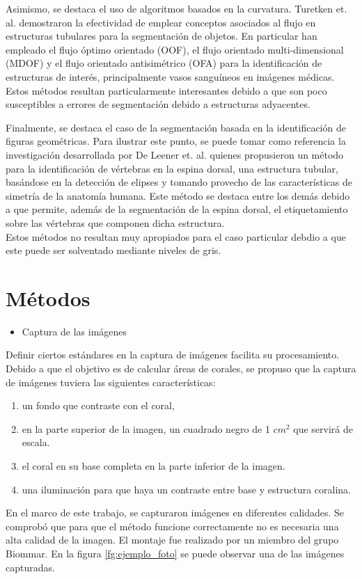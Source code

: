 \documentclass[journal]{IEEEtran}
\begin{document}
Asimismo, se destaca el uso de algoritmos basados en la curvatura. Turetken et. al.
\cite{flujo} demostraron la efectividad de emplear conceptos asociados al flujo en
estructuras tubulares para la segmentación de objetos. En particular han empleado el
flujo óptimo orientado (OOF), el flujo orientado multi-dimensional (MDOF) y el flujo
orientado antisimétrico (OFA) para la identificación de estructuras de interés,
principalmente vasos sanguíneos en imágenes médicas. Estos métodos resultan
particularmente interesantes debido a que son poco susceptibles a errores de segmentación
debido a estructuras adyacentes.

Finalmente, se destaca el caso de la segmentación basada en la identificación de figuras
geométricas. Para ilustrar este punto, se puede tomar como referencia la investigación
desarrollada por De Leener et. al. \cite{espina} quienes propusieron un método para la
identificación de vértebras en la espina dorsal, una estructura tubular, basándose en la
detección de elipses y tomando provecho de las características de simetría de la anatomía
humana. Este método se destaca entre los demás debido a que permite, además de la
segmentación de la espina dorsal, el etiquetamiento sobre las vértebras que componen
dicha estructura.\\
Estos métodos no resultan muy apropiados para el caso particular debdio a que este puede ser solventado mediante niveles de gris.

\section{Métodos}

\begin{itemize}
    \item Captura de las imágenes
\end{itemize}

\begin{par}
Definir ciertos estándares en la captura de imágenes facilita su procesamiento. Debido a que el objetivo es de calcular áreas de corales, se propuso que la captura de imágenes tuviera las siguientes características:
\begin{enumerate}
    \item un fondo que contraste con el coral,
    \item en la parte superior de la imagen, un cuadrado negro de 1 $cm^2$ que servirá de escala.
    \item el coral en su base completa en la parte inferior de la imagen.
    \item una iluminación para que haya un contraste entre base y estructura coralina.
\end{enumerate}
En el marco de este trabajo, se capturaron imágenes en diferentes
calidades. Se comprobó que para que el método funcione correctamente no
es necesaria una alta calidad de la imagen. El montaje fue realizado por 
un miembro del grupo Biommar. En la figura \ref{fg:ejemplo_foto} se puede observar una de las imágenes capturadas.
\end{par}
\end{document}
